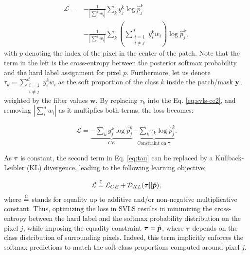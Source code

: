 \documentclass[twocolumn,final,10pt]{elsarticle}
\begin{document}
\begin{align}
\label{eq:svls-ce2}
\mathcal{L}  =  & - \frac{1}{| \sum_i^d w_i |} \sum_k   y^k_{j} \log \hat{p}^k_j  \\
&- \frac{1}{|  \sum_i^d w_i |} \sum_k  
\left(\sum_{\substack{i=1\\i\neq j}}^d y^k_i w_i\right) \log \hat{p}^k_j ,
\end{align}
%
with $p$ denoting the index of the pixel in the center of the patch. %
Note that the term in the left is the %
cross-entropy between the posterior softmax probability and the hard label %
assignment for pixel $p$. Furthermore, let us denote $\tau_k = \sum_{\substack{i=1\\i\neq j}}^d y^k_i w_i$ as the soft proportion of the class $k$ inside the patch/mask $\bf{y}$, weighted by the filter values $\mathbf{w}$. By replacing $\tau_k$ into the Eq. \ref{eq:svls-ce2}, and removing $|\sum_i^d w_i |$ as it multiplies both terms, %
the loss becomes:


\begin{align}
    \label{eq:tau}
    \mathcal{L}  = \underbrace{-\sum_k   y^k_{j} \log \hat{p}^k_j}_{CE} \underbrace{- \sum_k \tau_k \log \hat{p}^k_j}_{\textrm{Constraint on $\bm{\tau}$}}.
\end{align}

As $\bm{\tau}$ is constant, the second term in Eq. \ref{eq:tau} can be replaced by a Kullback-Leibler (KL) divergence, leading to the following learning objective:

\begin{align}
    \label{eq:globalLoss}
    \mathcal{L}  \ceq \mathcal{L}_{CE} + %
    \mathcal{D}_{KL}(\bm{\tau}||\hat{\vp}) ,
\end{align}
%
where $\ceq$ stands for equality up to additive and/or non-negative multiplicative constant. Thus, optimizing the loss %
in SVLS results in minimizing the %
cross-entropy between the hard label and the softmax probability distribution on the pixel $j$, %
while imposing the equality constraint $\bm{\tau}=\hat{{\bm{p}}}$, where $\bm{\tau}$ depends on the class distribution of surrounding pixels. %
Indeed, this term %
implicitly enforces the softmax predictions to match the soft-class proportions computed around pixel $j$. 
 
\end{document}
